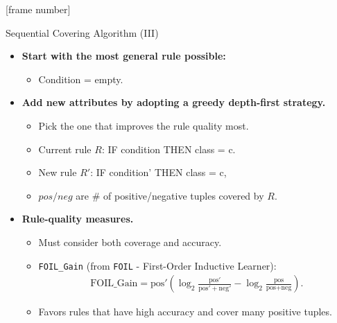 \documentclass[aspectratio=169,t,table]{beamer}
\begin{document}
  {
    [frame number]
    \begin{frame}{Sequential Covering Algorithm (III)}
      \begin{itemize}
        \item \textbf{Start with the most general rule possible:}
        \begin{itemize}
          \item Condition = empty.
        \end{itemize}
        \item \textbf{Add new attributes by adopting a greedy depth-first strategy.}
        \begin{itemize}
          \item Pick the one that improves the rule quality most.
          \item Current rule $R$: IF condition THEN class = c.
          \item New rule $R'$: IF condition' THEN class = c,
          \item $pos/neg$ are $\#$ of positive/negative tuples covered by $R$.
        \end{itemize}
        \item \textbf{Rule-quality measures.}
        \begin{itemize}
          \item Must consider both coverage and accuracy.
          \item \texttt{FOIL\_Gain} (from \texttt{FOIL} - First-Order Inductive Learner):
          \begin{align}
            \text{FOIL\_Gain} = \text{pos}' \left( \log_2 \frac{\text{pos}'}{\text{pos}' + \text{neg}'} - \log_2 \frac{\text{pos}}{\text{pos}+\text{neg}} \right).
          \end{align}
          \item Favors rules that have high accuracy and cover many positive tuples.
        \end{itemize}
      \end{itemize}
    \end{frame}
  }
\end{document}
